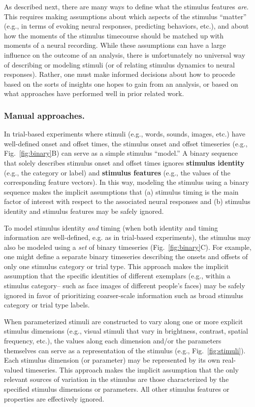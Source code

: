 \documentclass{llmxive}
\begin{document}
As described next, there are many ways to define what the stimulus
features \textit{are}.  This requires making assumptions about which
aspects of the stimulus ``matter'' (e.g., in terms of evoking neural
responses, predicting behaviors, etc.), and about how the moments of
the stimulus timecourse should be matched up with moments of a neural
recording.  While these assumptions can have a large influence on the
outcome of an analysis, there is unfortunately no universal way of
describing or modeling stimuli (or of relating stimulus dynamics to
neural responses).  Rather, one must make informed decisions about how
to procede based on the sorts of insights one hopes to gain from an
analysis, or based on what approaches have performed well in prior
related work. 

\subsubsection{Manual approaches.}
In trial-based experiments where stimuli (e.g., words, sounds, images,
etc.) have well-defined onset and offset times, the stimulus onset and
offset timeseries (e.g., Fig.~\ref{fig:binary}B) can serve as a
simple stimulus ``model.''  A binary sequence that solely describes
stimulus onset and offset times ignores \textbf{stimulus identity}
(e.g., the category or label) and \textbf{stimulus features} (e.g.,
the values of the corresponding feature vectors).  In this way,
modeling the stimulus using a binary sequence makes the implicit
assumptions that (a) stimulus timing is the main factor of interest with
respect to the associated neural responses and (b) stimulus identity
and stimulus features may be safely ignored.

To model stimulus identity \textit{and} timing (when both identity and
timing information are well-defined, e.g. as in trial-based
experiments), the stimulus may also be modeled using a \textit{set} of
binary timeseries (Fig.~\ref{fig:binary}C).  For example, one might
define a separate binary timeseries describing the onsets and offsets
of only one stimulus category or trial type.  This approach makes the
implicit assumption that the specific identities of different
exemplars (e.g., within a stimulus category-- such as face images of
different people's faces) may be safely ignored in favor of
prioritizing coarser-scale information such as broad stimulus category
or trial type labels.

When parameterized stimuli are constructed to vary along one or more
explicit stimulus dimensions (e.g., visual stimuli that vary in
brightness, contrast, spatial frequency, etc.), the values along each
dimension and/or the parameters themselves can serve as a
representation of the stimulus (e.g., Fig.~\ref{fig:stimuli}).  Each
stimulus dimension (or parameter) may be represented by its own
real-valued timeseries.  This approach makes the implicit assumption
that the only relevant sources of variation in the stimulus are those
characterized by the specified stimulus dimensions or parameters.  All
other stimulus features or properties are effectively ignored.
\end{document}
